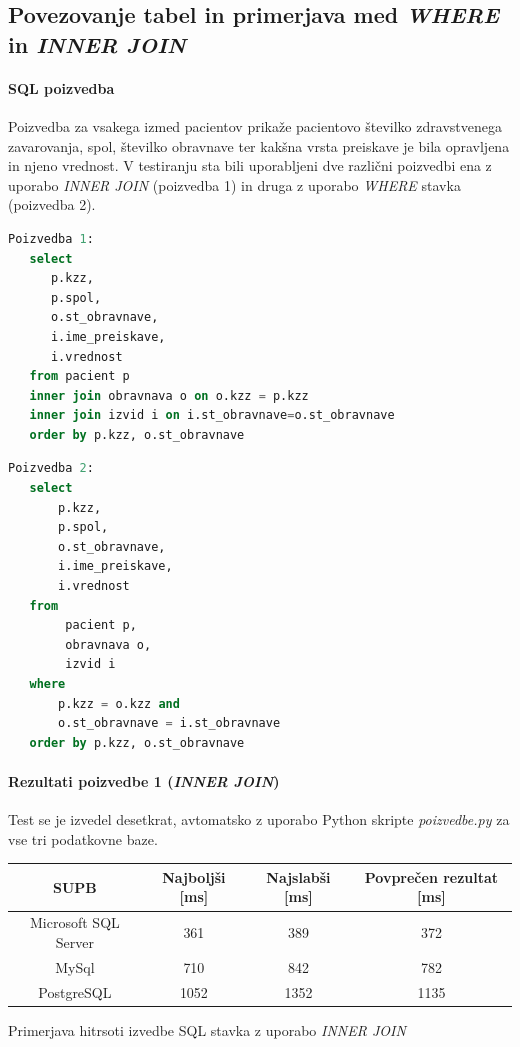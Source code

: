 \documentclass[a4paper,11pt]{report}
\begin{document}
\subsection{Povezovanje tabel in primerjava med \textit{WHERE} in \textit{INNER JOIN}}

\paragraph{SQL poizvedba}
Poizvedba za vsakega izmed pacientov prikaže pacientovo številko zdravstvenega zavarovanja, spol, številko obravnave
ter kakšna vrsta preiskave je bila opravljena in njeno vrednost. V testiranju sta bili uporabljeni dve različni poizvedbi
ena z uporabo \textit{INNER JOIN} (poizvedba 1) in druga z uporabo \textit{WHERE} stavka (poizvedba 2).
\begin{lstlisting}[language = SQL]
Poizvedba 1:
   select
      p.kzz,
      p.spol,
      o.st_obravnave,
      i.ime_preiskave,
      i.vrednost
   from pacient p
   inner join obravnava o on o.kzz = p.kzz
   inner join izvid i on i.st_obravnave=o.st_obravnave
   order by p.kzz, o.st_obravnave
\end{lstlisting}

\begin{lstlisting}[language = SQL]
Poizvedba 2:
   select
       p.kzz,
       p.spol,
       o.st_obravnave,
       i.ime_preiskave,
       i.vrednost
   from
        pacient p,
        obravnava o,
        izvid i
   where
       p.kzz = o.kzz and
       o.st_obravnave = i.st_obravnave
   order by p.kzz, o.st_obravnave
\end{lstlisting}

\paragraph{Rezultati poizvedbe 1 (\textit{INNER JOIN})}
Test se je izvedel desetkrat, avtomatsko z uporabo Python skripte \textit{poizvedbe.py} za vse tri podatkovne baze.

\begin{center}
   \begin{tabular}{||c|c|c|c||}
      \hline
      \textbf{SUPB} & \textbf{Najboljši [ms]} & \textbf{Najslabši [ms]} & \textbf{Povprečen rezultat [ms]}\\
      \hline
      \hline
      Microsoft SQL Server & 361 & 389 & 372 \\
      MySql & 710 & 842 & 782 \\
      PostgreSQL & 1052 & 1352 & 1135\\
      \hline
   \end{tabular}
\end{center}
Primerjava hitrsoti izvedbe SQL stavka z uporabo \textit{INNER JOIN}
\end{document}
